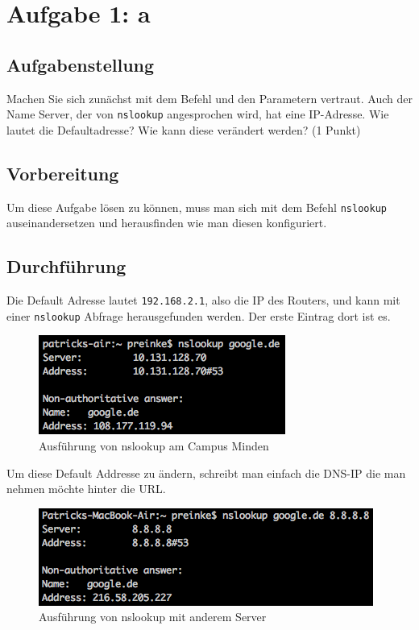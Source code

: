\newpage
\section{Aufgabe 1: a}

\subsection{Aufgabenstellung}
Machen Sie sich zunächst mit dem Befehl und den Parametern vertraut. Auch der Name Server, der von \texttt{nslookup} angesprochen wird, hat eine IP-Adresse. Wie lautet die Defaultadresse? Wie kann diese verändert werden? (1 Punkt)

\subsection{Vorbereitung}
Um diese Aufgabe lösen zu können, muss man sich mit dem Befehl \texttt{nslookup} auseinandersetzen und herausfinden wie man diesen konfiguriert. 

\subsection{Durchführung}
Die Default Adresse lautet \texttt{192.168.2.1}, also die IP des Routers, und kann mit einer \texttt{nslookup} Abfrage herausgefunden werden. Der erste Eintrag dort ist es.

\begin{figure}[H]
	\centering
	\includegraphics[width=0.4 \linewidth]{images/11}
	\caption{Ausführung von nslookup am Campus Minden}
\end{figure}

Um diese Default Addresse zu ändern, schreibt man einfach die DNS-IP die man nehmen möchte hinter die URL.

\begin{figure}[H]
	\centering
	\includegraphics[width=0.4 \linewidth]{images/12}
	\caption{Ausführung von nslookup mit anderem Server}
\end{figure}